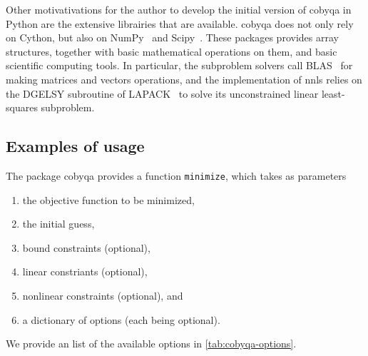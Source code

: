 Other motivativations for the author to develop the initial version of \gls{cobyqa} in Python are the extensive librairies that are available.
\Gls{cobyqa} does not only rely on Cython, but also on NumPy~\cite{Harris_Etal_2020} and Scipy~\cite{Virtanen_Etal_2020}.
These packages provides array structures, together with basic mathematical operations on them, and basic scientific computing tools.
In particular, the subproblem solvers call BLAS~\cite{Blackford_Etal_2002} for making matrices and vectors operations, and the implementation of \gls{nnls} relies on the DGELSY subroutine of LAPACK~\cite{Anderson_Etal_1999} to solve its unconstrained linear least-squares subproblem.

\subsection{Examples of usage}

The package \gls{cobyqa} provides a function \texttt{minimize}, which takes as parameters
\begin{enumerate}
    \item the objective function to be minimized,
    \item the initial guess,
    \item bound constraints (optional),
    \item linear constriants (optional),
    \item nonlinear constraints (optional), and
    \item a dictionary of options (each being optional).
\end{enumerate}

We provide an list of the available options in \cref{tab:cobyqa-options}.

